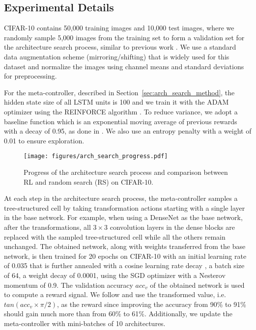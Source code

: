 \documentclass{article}
\begin{document}
\subsection{Experimental Details}
CIFAR-10 contains 50,000 training images and 10,000 test images, where we randomly sample 5,000 images from the training set to form a validation set for the architecture search process, similar to previous work \cite{zoph2017learning,cai2018efficient}. We use a standard data augmentation scheme (mirroring/shifting) that is widely used for this dataset \cite{huang2016densely,han2016deep,cai2018efficient} and normalize the images using channel means and standard deviations for preprocessing.

For the meta-controller, described in Section~\ref{sec:arch_search_method}, the hidden state size of all LSTM units is 100 and we train it with the ADAM optimizer \cite{kingma2014adam} using the REINFORCE algorithm \cite{williams1992simple}. To reduce variance, we adopt a baseline function which is an exponential moving average of previous rewards with a decay of 0.95, as done in \citet{cai2018efficient}. We also use an entropy penalty with a weight of 0.01 to ensure exploration. 

\begin{figure}[t]
	\centering
	\texttt{[image: figures/arch\_search\_progress.pdf]}
    \vspace{-10pt}
	\caption{Progress of the architecture search process and comparison between RL and random search (RS) on CIFAR-10.}\vspace{-15pt}
	\label{fig:arch_search_progress}
\end{figure}

At each step in the architecture search process, the meta-controller samples a tree-structured cell by taking transformation actions starting with a single layer in the base network. For example, when using a DenseNet as the base network, after the transformations, all $3 \times 3$ convolution layers in the dense blocks are replaced with the sampled tree-structured cell while all the others remain unchanged. The obtained network, along with weights transferred from the base network, is then trained for 20 epochs on CIFAR-10 with an initial learning rate of 0.035 that is further annealed with a cosine learning rate decay \cite{loshchilov2016sgdr}, a batch size of 64, a weight decay of 0.0001, using the SGD optimizer with a Nesterov momentum of 0.9. The validation accuracy $acc_v$ of the obtained network is used to compute a reward signal. We follow \citet{cai2018efficient} and use the transformed value, i.e. $tan(acc_v \times \pi / 2)$, as the reward since improving the accuracy from 90\% to 91\% should gain much more than from 60\% to 61\%. Additionally, we update the meta-controller with mini-batches of 10 architectures. 
 
\end{document}
